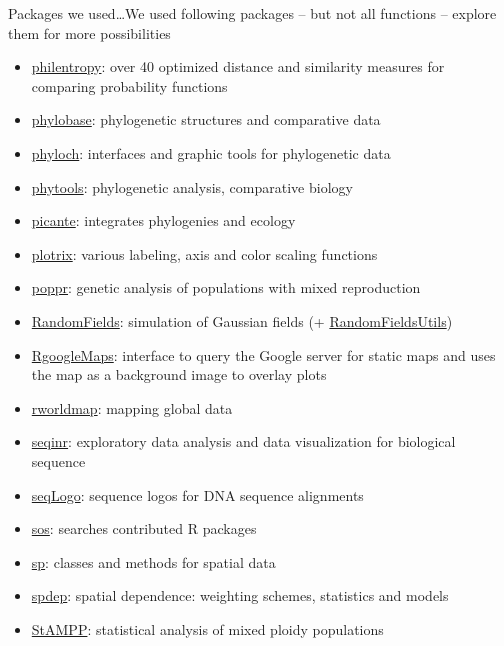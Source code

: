 \documentclass[compress, ucs, xelatex, 11pt, xcolor=svgnames,
  hyperref={
    bookmarks=true,
    unicode=true,
    colorlinks=true,
    pdftitle={Molecular data in R},
    plainpages=false,
    pdfauthor={Vojtech Zeisek},
    pdfsubject={Course about phylogeny and evolution in R},
    pdfcreator={XeLaTeX},
    pdfkeywords={R, evolution, phylogeny, molecular data},
    linkcolor=Tomato,
    anchorcolor=SaddleBrown,
    citecolor=Goldenrod,
    filecolor=DarkMagenta,
    menucolor=Sienna,
    urlcolor=DarkTurquoise,
    pdftex},
  url={hyphens, lowtilde} %
  ]{beamer}
\begin{document}
\begin{frame}[allowframebreaks]{Packages we used\ldots}{We used following packages -- but not all functions -- explore them for more possibilities}
\begin{itemize}
    \item \href{https://CRAN.R-project.org/package=philentropy}{philentropy}: over 40 optimized distance and similarity measures for comparing probability functions
    \item \href{https://CRAN.R-project.org/package=phylobase}{phylobase}: phylogenetic structures and comparative data
    \item \href{http://www.christophheibl.de/Rpackages.html}{phyloch}: interfaces and graphic tools for phylogenetic data
    \item \href{https://CRAN.R-project.org/package=phytools}{phytools}: phylogenetic analysis, comparative biology
    \item \href{https://CRAN.R-project.org/package=picante}{picante}: integrates phylogenies and ecology
    \item \href{https://CRAN.R-project.org/package=plotrix}{plotrix}: various labeling, axis and color scaling functions
    \item \href{https://CRAN.R-project.org/package=poppr}{poppr}: genetic analysis of populations with mixed reproduction
    \item \href{https://CRAN.R-project.org/package=RandomFields}{RandomFields}: simulation of Gaussian fields (+ \href{https://CRAN.R-project.org/package=RandomFieldsUtils}{RandomFieldsUtils})
    \item \href{https://CRAN.R-project.org/package=RgoogleMaps}{RgoogleMaps}: interface to query the Google server for static maps and uses the map as a background image to overlay plots
    \item \href{https://CRAN.R-project.org/package=rworldmap}{rworldmap}: mapping global data
    \item \href{https://CRAN.R-project.org/package=seqinr}{seqinr}: exploratory data analysis and data visualization for biological sequence
    \item \href{https://www.bioconductor.org/packages/release/bioc/html/seqLogo.html}{seqLogo}: sequence logos for DNA sequence alignments
    \item \href{https://CRAN.R-project.org/package=sos}{sos}: searches contributed R packages
    \item \href{https://CRAN.R-project.org/package=sp}{sp}: classes and methods for spatial data
    \item \href{https://CRAN.R-project.org/package=spdep}{spdep}: spatial dependence: weighting schemes, statistics and models
    \item \href{https://CRAN.R-project.org/package=StAMPP}{StAMPP}: statistical analysis of mixed ploidy populations

\end{itemize}
\end{frame}
\end{document}
